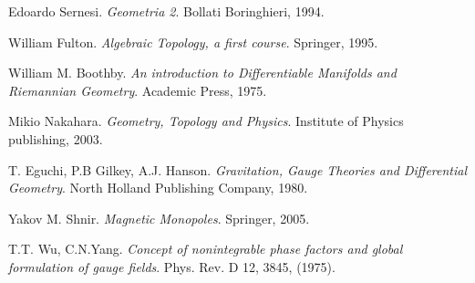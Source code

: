 \begin{thebibliography}{9}

   Edoardo Sernesi.
   \textit{Geometria 2}.
   Bollati Boringhieri, 1994.

  William Fulton.
  \textit{Algebraic Topology, a first course}.
  Springer, 1995.

   William M. Boothby.
   \textit{An introduction to Differentiable Manifolds and Riemannian Geometry}.
   Academic Press, 1975.

   Mikio Nakahara.
   \textit{Geometry, Topology and Physics}.
   Institute of Physics publishing, 2003.

  T. Eguchi, P.B Gilkey, A.J. Hanson.
  \textit{Gravitation, Gauge Theories and Differential Geometry}.
  North Holland Publishing Company, 1980.

  Yakov M. Shnir.
  \textit{Magnetic Monopoles}.
  Springer, 2005.

   T.T. Wu, C.N.Yang.
   \textit{Concept of nonintegrable phase factors and global formulation of gauge fields}.
   Phys. Rev. D 12, 3845, (1975).

%

\end{thebibliography}
